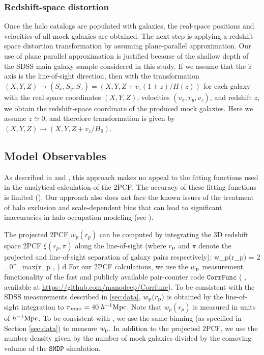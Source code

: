 \subsubsection{Redshift-space distortion}

Once the halo catalogs are populated with galaxies, the real-space positions and velocities of all mock galaxies are obtained. The next step is applying a redshift-space distortion transformation by assuming plane-parallel approximation.
Our use of plane parallel approximation is justified because of the shallow depth of the SDSS main galaxy sample considered in this study.
If we assume that the $\hat{z}$ axis is the line-of-sight direction, then with the transformation $(X,Y,Z) \rightarrow (S_x,S_y,S_z) = (X , Y ,Z + v_{z}(1+z)/H(z))$
for each galaxy with the real space coordinates $(X,Y,Z)$, velocities $(v_x,v_y,v_z)$, and redshift $z$, we obtain the redshift-space coordinate of the produced mock galaxies. Here we assume $z \simeq 0$, and therefore transformation is given by $(X,Y,Z) \rightarrow (X,Y,Z+v_{z}/H_{0})$.   

\subsection{Model Observables}

As described in \citealt{decorated} and \citealt{2016arXiv160701782H}, this approach makes no appeal to the fitting functions used in the analytical calculation of the 2PCF. The accuracy of these fitting functions is limited (\citealt{tinker08,tinker10,watson13}). Our approach also does not face the known issues of the treatment of halo exclusion and scale-dependent bias that can lead to significant inaccuracies in halo occupation modeling (see \citealt{vdb13}). 

The projected 2PCF $w_{p}(r_{p})$ can be computed by integrating the 3D redshift space 2PCF $\xi(r_{p} , \pi)$ along the line-of-sight (where $r_{\rm p}$ and $\pi$ denote the projected and line-of-sight separation of galaxy pairs respectively):
\beq
w_{p}(r_{p}) = 2 \int_{0}^{\pi_{max}}\xi(r_{p} , \pi)\; d\pi
\label{los}
\eeq
For our 2PCF calculations, we use the $w_{\rm p}$ measurement functionality of the fast and publicly available pair-counter code $\mathtt{CorrFunc}$ (\citealt{corrfunc} , available at \url{https://github.com/manodeep/Corrfunc}). To be consistent with the SDSS measurements described in \ref{sec:data}, $w_{\rm{p}}(r_{\rm{p}})$ is obtained by the line-of-sight integration to $\pi_{max}=40 \; h^{-1}\rm{Mpc}$. Note that $w_{p}(r_{p})$ is measured in units of $h^{-1}\rm{Mpc}$. To be consistent with \citealt{guo2015}, we use the same binning (as specified in Section \ref{sec:data}) to measure $w_{\rm p}$. In addition to the projected 2PCF, we use the number density given by the number of mock galaxies divided by the comoving volume of the $\mathtt{SMDP}$ simulation. 

